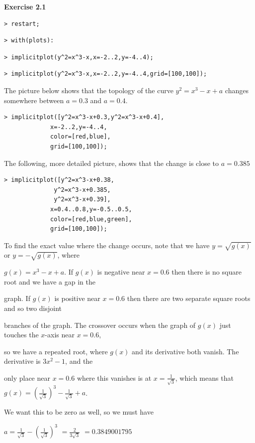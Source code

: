 \documentclass{article}
\begin{document}
\begin{Maple Normal}
\textbf{Exercise 2.1}
\end{Maple Normal}
\begin{lstlisting}
> restart;
\end{lstlisting}
\begin{lstlisting}
> with(plots):
\end{lstlisting}
\begin{lstlisting}
> implicitplot(y^2=x^3-x,x=-2..2,y=-4..4);
\end{lstlisting}
\begin{lstlisting}
> implicitplot(y^2=x^3-x,x=-2..2,y=-4..4,grid=[100,100]);
\end{lstlisting}
\begin{Maple Normal}
The picture below shows that the topology of the curve 
$ y^{2}=x^{3}-x +a  $ changes somewhere between 
$ a = 0.3 $ and 
$ a = 0.4 $.
\end{Maple Normal}
\begin{lstlisting}
> implicitplot([y^2=x^3-x+0.3,y^2=x^3-x+0.4],
             x=-2..2,y=-4..4,
             color=[red,blue],
             grid=[100,100]);
\end{lstlisting}
\begin{Maple Normal}
The following, more detailed picture, shows that the change is close to 
$ a = 0.385 $
\end{Maple Normal}
\begin{lstlisting}
> implicitplot([y^2=x^3-x+0.38,
              y^2=x^3-x+0.385,
              y^2=x^3-x+0.39],
             x=0.4..0.8,y=-0.5..0.5,
             color=[red,blue,green],
             grid=[100,100]);
\end{lstlisting}
\begin{Maple Normal}
To find the exact value where the change occurs, note that we have 
$ y =\sqrt{g (x)} $ or 
$ y =-\sqrt{g (x)} $, where\


$ g (x)=x^{3}-x +a  $.  If 
$ g (x) $ is negative near  
$ x = 0.6 $ then there is no square root and we have a gap in the\

graph.  If 
$ g (x) $ is positive near 
$ x = 0.6 $ then there are two separate square roots and so two disjoint\

branches of the graph.  The crossover occurs when the graph of 
$ g (x) $ just touches the 
$ x  $-axis near 
$ x = 0.6 $,\

so we have a repeated root, where 
$ g (x) $ and its derivative both vanish.  The derivative is 
$ 3 x^{2}-1 $, and the\

only place near 
$ x = 0.6 $ where this vanishes is at 
$ x =\frac{1}{\sqrt{3}} $, which means that 
$ g (x)=(\frac{1}{\sqrt{3}})^{3}-\frac{1}{\sqrt{3}}+a  $.\

We want this to be zero as well, so we must have\


$ a =\frac{1}{\sqrt{3}}-(\frac{1}{\sqrt{3}})^{3} $
$ =\frac{2}{3 \sqrt{3}} $  
$ = 0.3849001795 $
\end{Maple Normal}
\end{document}
